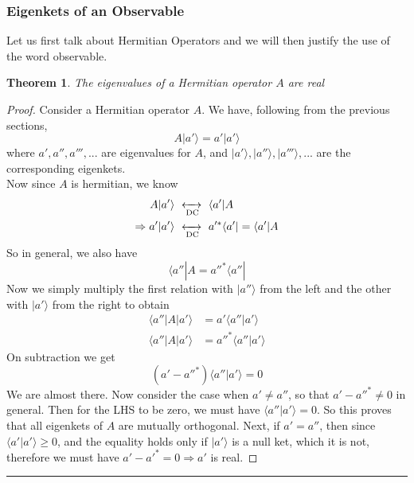 \documentclass[12pt]{article}
\def\dc{\,\,\xleftrightarrow[\text{DC}]{}\,\,}
\def\bra#1{\langle#1|}
\def\ket#1{|#1 \rangle}
\def\inpr#1#2{\langle #1|#2 \rangle}
\def\braket#1#2#3{\langle#1|#2|#3\rangle}
\newtheorem*{theorem*}{Theorem}
\begin{document}
			\subsubsection{Eigenkets of an Observable}
				Let us first talk about Hermitian Operators and we will then justify the use of the word observable.\\
				\begin{theorem*}
					The eigenvalues of a Hermitian operator $A$ are real
				\end{theorem*}
				\begin{proof}
					Consider a Hermitian operator $A$. We have, following from the previous sections,
					\begin{equation}
						A\ket {a'} = a'\ket{a'}
					\end{equation}
					where $a', a'', a''', ...$ are eigenvalues for $A$, and $\ket{a'}, \ket {a''}, \ket {a'''},...$ are the corresponding eigenkets.\\
					Now since $A$ is hermitian, we know
					\begin{align*}
						A\ket{a'} &\dc \bra{a'}A \\
						\Rightarrow a'\ket{a'} &\dc a'^*\bra{a'} = \bra{a'}A
					\end{align*}
					So in general, we also have
					\begin{equation}
						\bra {a''} A = a''^* \bra{a''}
					\end{equation}
					Now we simply multiply the first relation with $\ket{a''}$ from the left and the other with $\ket{a'}$ from the right to obtain
					\begin{align}
						\braket {a''}A{a'} &= a'\inpr{a''}{a'} \\
						\braket {a''} A {a'} &= a''^* \inpr{a''}{a'}
					\end{align}
					On subtraction we get 
					\begin{equation}
						(a' - a''^*)\inpr{a''}{a'} = 0
					\end{equation}
					We are almost there. Now consider the case when $a' \ne a''$, so that $a'-a''^* \ne 0$ in general. Then for the LHS to be zero, we must have $\inpr {a''}{a'}=0$. So this proves that all eigenkets of $A$ are mutually orthogonal. Next, if $a' = a''$, then since $\inpr {a'}{a'} \ge 0$, and the equality holds only if $\ket {a'}$ is a null ket, which it is not, therefore we must have $a'-a'^* = 0 \Rightarrow a'$ is real.
				\end{proof}
			
\vspace{12pt}
\hrule
\end{document}
